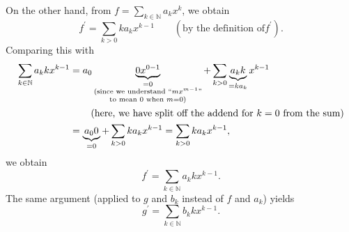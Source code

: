 \documentclass[paper=a4, fontsize=12pt]{scrartcl}%
\let\sumnonlimits\sum
\renewcommand{\sum}{\sumnonlimits\limits}
\theoremstyle{plainsl}
\theoremstyle{definition}
\theoremstyle{remark}
\begin{document}
On the other hand, from $f=\sum_{k\in\mathbb{N}}a_{k}x^{k}$, we obtain%
\[
f^{\prime}=\sum_{k>0}ka_{k}x^{k-1}\qquad\left(  \text{by the definition of
}f^{\prime}\right)  .
\]
Comparing this with%
\begin{align*}
\sum_{k\in\mathbb{N}}a_{k}kx^{k-1}  &  =a_{0}\underbrace{0x^{0-1}%
}_{\substack{=0\\\text{(since we understand \textquotedblleft}mx^{m-1}%
\text{\textquotedblright}\\\text{to mean }0\text{ when }m=0\text{)}}%
}+\sum_{k>0}\underbrace{a_{k}k}_{=ka_{k}}x^{k-1}\\
&  \qquad\left(  \text{here, we have split off the addend for }k=0\text{ from
the sum}\right) \\
&  =\underbrace{a_{0}0}_{=0}+\sum_{k>0}ka_{k}x^{k-1}=\sum_{k>0}ka_{k}x^{k-1},
\end{align*}
we obtain%
\begin{equation}
f^{\prime}=\sum_{k\in\mathbb{N}}a_{k}kx^{k-1}. \label{sol.pol.diff1.c.pf.f'=}%
\end{equation}
The same argument (applied to $g$ and $b_{k}$ instead of $f$ and $a_{k}$)
yields%
\begin{equation}
g^{\prime}=\sum_{k\in\mathbb{N}}b_{k}kx^{k-1}. \label{sol.pol.diff1.c.pf.g'=}%
\end{equation}
\end{document}
